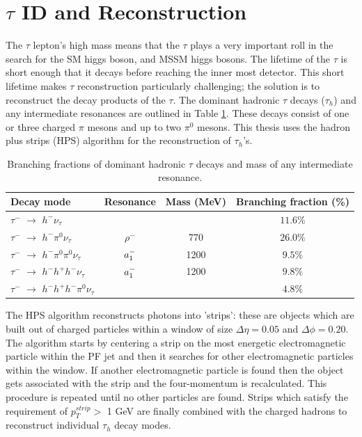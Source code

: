 \section{$\tau$ ID and Reconstruction}
The $\tau$ lepton's high mass means that the $\tau$ plays a very important
roll in the search for the SM higgs boson, and MSSM higgs bosons.
The lifetime of the $\tau$ is short enough that it decays before reaching the inner
most detector. This short lifetime makes $\tau$ reconstruction particularly challenging;
the solution is to reconstruct the decay products of the $\tau$. 
The dominant hadronic $\tau$ decays ($\tau_{h}$) 
and any intermediate resonances are 
outlined in Table \ref{tab:decay_modes}. 
These decays consist of one or three charged $\pi$ mesons and up to two $\pi^{0}$ mesons.
This thesis uses the hadron plus strips (HPS) algorithm for the reconstruction of 
$\tau_{h}$'s. %
\begin{table}[b]
\begin{center}
\begin{tabular}{|l|c|c|c|}
\hline
Decay mode & Resonance & Mass (MeV) &  Branching fraction (\%) \\
\hline
$\tau^{-}$  $\rightarrow $  $h^{-} \nu_{\tau}$ &  &  & $11.6\%$ \\
$\tau^{-}$  $\rightarrow $  $h^{-} \pi^{0}  \nu_{\tau}$ & $\rho^{-}$ & 770 & $26.0\%$ \\
$\tau^{-}$  $\rightarrow $  $h^{-} \pi^{0}\pi^{0}  \nu_{\tau}$ & $a_{\rm{1}}^{-}$ & 1200 & $9.5\%$ \\
$\tau^{-}$  $\rightarrow $  $h^{-} h^{+} h^{-} \nu_{\tau}$ & $a_{\rm{1}}^{-}$  & 1200 & $9.8\%$ \\
$\tau^{-}$  $\rightarrow $  $h^{-} h^{+} h^{-}\pi^{0}  \nu_{\tau}$ & & & $4.8\%$ \\
      \hline
\end{tabular}
\caption{
   Branching fractions of dominant hadronic $\tau$ decays and mass of any intermediate resonance. 
   }
\label{tab:decay_modes}
\end{center}
\end{table}

The HPS algorithm 
reconstructs photons into 'strips': these are objects which are built
out of charged particles within a window of size $\Delta\eta=0.05$
and $\Delta\phi=0.20$. The algorithm starts by centering a strip on the
most energetic electromagnetic particle within the PF jet and then it searches
for other electromagnetic particles within the window. If another electromagnetic
particle is found then the object gets associated with the strip and
the four-momentum is recalculated. This procedure is repeated until no other
particles are found. Strips which satisfy the requirement of $p_{T}^{strip}>$ 1 GeV 
are finally combined with the charged hadrons to reconstruct individual
$\tau_{h}$ decay modes.

